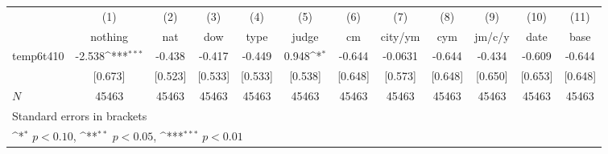 {
\def\sym#1{\ifmmode^{#1}\else\(^{#1}\)\fi}
\begin{tabular}{l*{11}{c}}
\hline\hline
            &\multicolumn{1}{c}{(1)}&\multicolumn{1}{c}{(2)}&\multicolumn{1}{c}{(3)}&\multicolumn{1}{c}{(4)}&\multicolumn{1}{c}{(5)}&\multicolumn{1}{c}{(6)}&\multicolumn{1}{c}{(7)}&\multicolumn{1}{c}{(8)}&\multicolumn{1}{c}{(9)}&\multicolumn{1}{c}{(10)}&\multicolumn{1}{c}{(11)}\\
            &\multicolumn{1}{c}{nothing}&\multicolumn{1}{c}{nat}&\multicolumn{1}{c}{dow}&\multicolumn{1}{c}{type}&\multicolumn{1}{c}{judge}&\multicolumn{1}{c}{cm}&\multicolumn{1}{c}{city/ym}&\multicolumn{1}{c}{cym}&\multicolumn{1}{c}{jm/c/y}&\multicolumn{1}{c}{date}&\multicolumn{1}{c}{base}\\
\hline
temp6t410   &      -2.538\sym{***}&      -0.438         &      -0.417         &      -0.449         &       0.948\sym{*}  &      -0.644         &     -0.0631         &      -0.644         &      -0.434         &      -0.609         &      -0.644         \\
            &     [0.673]         &     [0.523]         &     [0.533]         &     [0.533]         &     [0.538]         &     [0.648]         &     [0.573]         &     [0.648]         &     [0.650]         &     [0.653]         &     [0.648]         \\
\hline
\(N\)       &       45463         &       45463         &       45463         &       45463         &       45463         &       45463         &       45463         &       45463         &       45463         &       45463         &       45463         \\
\hline\hline
\multicolumn{12}{l}{\footnotesize Standard errors in brackets}\\
\multicolumn{12}{l}{\footnotesize \sym{*} \(p<0.10\), \sym{**} \(p<0.05\), \sym{***} \(p<0.01\)}\\
\end{tabular}
}
